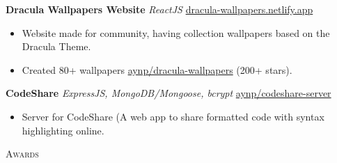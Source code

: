 \documentclass[a4paper]{article}
\newcommand{\lineunder} {
    \vspace*{-8pt} \\
    \hspace*{-18pt} \hrulefill \\
}
\newcommand{\header} [1] {
    {\hspace*{-18pt}\vspace*{6pt} \textsc{#1}}
    \vspace*{-6pt} \lineunder
}
\begin{document}

{\textbf{Dracula Wallpapers Website}} {\sl ReactJS} \hfill \href{https://dracula-wallpapers.netlify.app/}{dracula-wallpapers.netlify.app}\\
\begin{itemize}
	\item Website made for community, having collection wallpapers based on the Dracula Theme.
	\item Created 80+ wallpapers \href{https://github.com/aynp/dracula-wallpapers}{aynp/dracula-wallpapers} (200+ stars).
\end{itemize}
\vspace*{1.5mm}



{\textbf{CodeShare}} {\sl ExpressJS, MongoDB/Mongoose, bcrypt} \hfill \href{https://github.com/aynp/codeshare-server}{aynp/codeshare-server}\\
\begin{itemize}
	\item Server for CodeShare (A web app to share formatted code with syntax highlighting online.
\end{itemize}
\vspace*{1.5mm}



\header{Awards}
\vspace{1mm}
\end{document}
